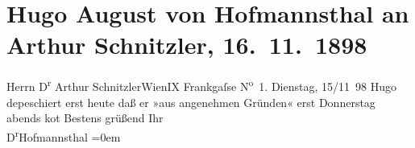 

         
         \renewcommand{\erwaehntePersonen}{Personen: Hugo von Hofmannsthal}
         \renewcommand{\erwaehnteOrte}{Orte: Frankgasse, I., Innere Stadt, Wien}
         \renewcommand{\erwaehnteWerke}{}
               \section[Hugo August von Hofmannsthal an Arthur Schnitzler, 16. 11. 1898]{ Hugo August von Hofmannsthal an Arthur Schnitzler, 16. 11. 1898}\nopagebreak{}\rehead{ }\begin{ledgroupsized}[t]{13cm}\normalsize\beginnumbering \toendnotes[C]{\smallbreak\pagebreak[2]} 
\pstart{}{\pb}Herrn D\textsuperscript{r} Arthur
                  Schnitzler\pend{}\pstart{}Wien\pend{}\pstart{}IX Frankgaſse N\textsuperscript{o} 1.\pend{}{\bigskip}\pstart
           \raggedleft{}{\pb}Dienstag, 15/11 98\pend
           \pstart
           Hugo depeschiert erst heute daß er »aus
               angenehmen Gründen« erst Donnerstag abends ko{\geminationm}t\pend
           \pstart
           Bestens grüßend Ihr{\\[\baselineskip]}\spacefill\mbox{D\textsuperscript{r}Hofmannsthal}\pend
           \leftskip=0em{}
         
         \endnumbering{}\end{ledgroupsized}  \newcommand{\dateiname}{L00857}\newcommand{\titel}{Hugo August von Hofmannsthal an Arthur Schnitzler, 16. 11. 1898}\newcommand{\editorInnen}{Martin Anton Müller und Gerd-Hermann Susen}
      